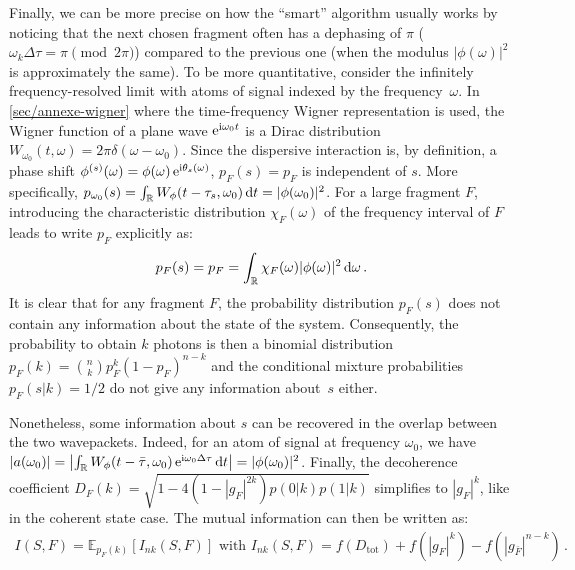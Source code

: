 Finally, we can be more precise on how the ``smart'' algorithm
usually works by noticing that the next chosen fragment often has a dephasing
of $\pi$ ($\omega_k \Delta \tau = \pi \pmod{2 \pi}$) compared to the previous one (when the modulus $|\phi(\omega)|^2$
is approximately the same).
%
To be more quantitative, consider the infinitely frequency-resolved limit with 
atoms of signal indexed by the frequency~$\omega$. In
\cref{sec/annexe-wigner} where the time-frequency Wigner representation
is used, the Wigner function of a plane wave $\mathrm{e}^{\mathrm{i}\omega_0t}$ is
a Dirac distribution $W_{\omega_0}(t,\omega) = 2\pi\delta(\omega-\omega_0)$. 
Since the dispersive interaction is, by definition, a phase 
shift $\phi^{(s)}(\omega) = \phi(\omega) \,\mathrm{e}^{\mathrm{i}\theta_s(\omega)}$,
$p_F(s) = p_F$ is independent of $s$. More specifically,
$p_{\omega_0}(s) = \int_{\mathbb{R}} W_{\phi}(t-\tau_s,\omega_0)
\, \mathrm{d} t =|\phi(\omega_0)|^2$. For a large fragment $F$, 
introducing the characteristic distribution $\chi_F(\omega)$ of the 
frequency interval of $F$ leads to write $p_F$ explicitly as:
%
\begin{align}
p_F(s) = p_F = \int_{\mathbb{R}} \chi_F(\omega) |\phi(\omega)|^2 
\, \mathrm{d}\omega
\,.
\end{align}
It is clear that for any fragment $F$, the probability distribution
$p_F(s)$ does not contain any information about the state of the system.
Consequently, the probability to obtain $k$ photons is then a binomial
distribution $p_F(k) = \binom{n}{k} p_F^k (1-p_F)^{n-k}$
and the conditional mixture probabilities $p_F(s|k) = 1/2$ do not
give any information about~$s$ either. 

Nonetheless, some information about $s$ can be recovered in the overlap
between the two wavepackets. Indeed, for an atom of signal at frequency
$\omega_0$, we have $|a(\omega_0)| = \left| \int_{\mathbb{R}} 
W_{\phi}(t-\bar{\tau},\omega_0) \,\mathrm{e}^{\mathrm{i}\omega_0\Delta\tau}\, \mathrm{d} t \right| 
=|\phi(\omega_0)|^2$. 
%
Finally, the decoherence coefficient $D_F(k) = \sqrt{1-4(1-|g_F|^{2k})
p(0|k)p(1|k)}$ simplifies to $|g_F|^k$, like in the coherent state case. 
The mutual information can then be written as:
%
\begin{align}
	I(S,F) = \mathbb{E}_{p_F(k)}[I_{nk}(S,F)]
\text{ with }
I_{nk}(S,F) = f(D_{\text{tot}}) + f(|g_F|^k) - 
	f(|g_{\bar{F}}|^{n-k})
\,.
\end{align}

